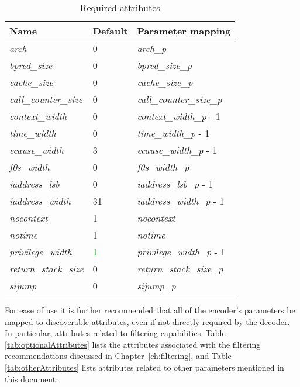 \begin{table}[!h]
    \centering
    \caption{Required attributes}
    \label{tab:requiredAttributes}
    \begin{tabulary}{\textwidth}{|l|l|p{80mm}|}
        \hline
        \textbf{Name} & \textbf{Default} & \textbf{Parameter mapping} \\
        \hline
        \textit{arch} & 0 & \textit{arch\_p} \\
        \hline
        \textit{bpred\_size} & 0 & \textit{bpred\_size\_p}  \\
        \hline
        \textit{cache\_size} & 0 & \textit{cache\_size\_p} \\
        \hline
        \textit{call\_counter\_size} & 0 & \textit{call\_counter\_size\_p} \\
        \hline
        \textit{context\_width} & 0 & \textit{context\_width\_p} - 1 \\
        \hline
        \textit{time\_width} & 0 & \textit{time\_width\_p} - 1 \\
        \hline
        \textit{ecause\_width} & 3 & \textit{ecause\_width\_p} - 1 \\
        \hline
        \textit{f0s\_width} & 0 & \textit{f0s\_width\_p} \\
        \hline
        \textit{iaddress\_lsb} & 0 & \textit{iaddress\_lsb\_p} - 1 \\
        \hline
        \textit{iaddress\_width} & 31 & \textit{iaddress\_width\_p} - 1 \\
        \hline
        \textit{nocontext} & 1 & \textit{nocontext} \\
        \hline
        \textit{notime} & 1 & \textit{notime} \\
        \hline
        \textit{privilege\_width} & \textcolor{green}{1} & \textit{privilege\_width\_p} - 1 \\
        \hline
        \textit{return\_stack\_size} & 0 & \textit{return\_stack\_size\_p} \\
        \hline
        \textit{sijump} & 0 & \textit{sijump\_p} \\
        \hline
    \end{tabulary}
\end{table}

For ease of use it is further recommended that all of the encoder's parameters be mapped to 
discoverable attributes, even if not directly required by the decoder.  In particular, 
attributes related to filtering capabilities.  Table \ref{tab:optionalAttributes} lists the attributes
associated with the filtering recommendations discussed in Chapter~\ref{ch:filtering}, and 
Table \ref{tab:otherAttributes} lists attributes related to other parameters mentioned in this 
document.


